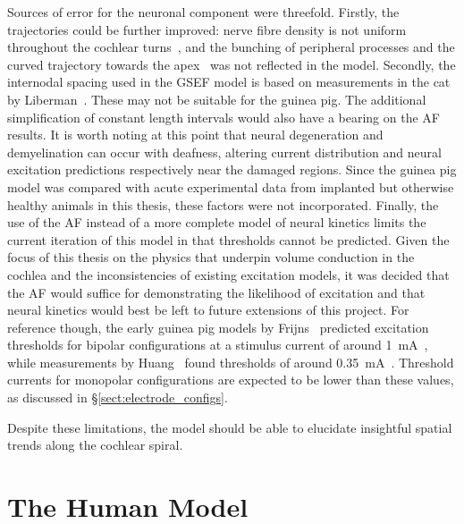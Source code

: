 Sources of error for the neuronal component were threefold. Firstly, the
trajectories could be further improved: nerve fibre density is not uniform
throughout the cochlear turns~\cite{bredberg1965,spoendlin1985}, and the
bunching of peripheral processes and the curved trajectory towards the
apex~\cite{wright2005} was not reflected in the model. Secondly, the internodal
spacing used in the GSEF model is based on measurements in the cat by
Liberman~\cite{liberman1984}. These may not be suitable for the guinea pig. The
additional simplification of constant length intervals would also have a bearing
on the AF results. It is worth noting at this point that neural degeneration and
demyelination can occur with deafness, altering current distribution and neural
excitation predictions respectively near the damaged regions. Since the guinea
pig model was compared with acute experimental data from implanted but otherwise
healthy animals in this thesis, these factors were not incorporated. Finally,
the use of the AF instead of a more complete model of neural kinetics limits the
current iteration of this model in that thresholds cannot be predicted. Given
the focus of this thesis on the physics that underpin volume conduction in the
cochlea and the inconsistencies of existing excitation models, it was decided
that the AF would suffice for demonstrating the likelihood of excitation and
that neural kinetics would best be left to future extensions of this project.
For reference though, the early guinea pig models by Frijns~\etal{} predicted
excitation thresholds for bipolar configurations at a stimulus current of around
1~mA~\cite{frijns2000, briaire2000field}, while \invivo{} measurements by
Huang~\etal{} found thresholds of around 0.35~mA~\cite{huang1999reduction}.
Threshold currents for monopolar configurations are expected to be lower than
these values, as discussed in \S\ref{sect:electrode_configs}.


Despite these limitations, the model should be able to elucidate insightful
spatial trends along the cochlear spiral.

\section{The Human Model}
\label{sect:human_model}

